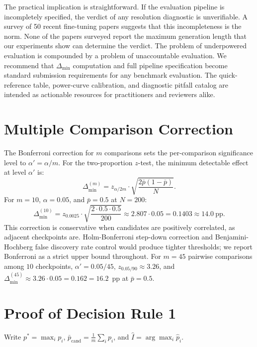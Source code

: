\documentclass[pdflatex,sn-mathphys-ay,iicol]{sn-jnl}
\theoremstyle{thmstylethree}
\begin{document}
\begin{table}[t]
\begin{table}[t]
The practical implication is straightforward. If the evaluation pipeline is incompletely specified, the verdict of any resolution diagnostic is unverifiable. A survey of 50 recent fine-tuning papers suggests that this incompleteness is the norm. None of the papers surveyed report the maximum generation length that our experiments show can determine the verdict. The problem of underpowered evaluation is compounded by a problem of unaccountable evaluation. We recommend that $\Delta_{\min}$ computation and full pipeline specification become standard submission requirements for any benchmark evaluation. The quick-reference table, power-curve calibration, and diagnostic pitfall catalog are intended as actionable resources for practitioners and reviewers alike.

\appendix

\section{Multiple Comparison Correction}\label{app:proof}

The Bonferroni correction for $m$ comparisons sets the per-comparison significance level to $\alpha' = \alpha / m$. For the two-proportion $z$-test, the minimum detectable effect at level $\alpha'$ is:
\[
\Delta_{\min}^{(m)} = z_{\alpha/2m} \cdot \sqrt{\frac{2\bar{p}(1-\bar{p})}{N}}.
\]
For $m=10$, $\alpha=0.05$, and $\bar{p}=0.5$ at $N=200$:
\[
\Delta_{\min}^{(10)} = z_{0.0025} \cdot \sqrt{\frac{2 \cdot 0.5 \cdot 0.5}{200}} \approx 2.807 \cdot 0.05 = 0.1403 \approx 14.0\ \text{pp}.
\]
This correction is conservative when candidates are positively correlated, as adjacent checkpoints are. Holm-Bonferroni step-down correction and Benjamini-Hochberg false discovery rate control would produce tighter thresholds; we report Bonferroni as a strict upper bound throughout. For $m=45$ pairwise comparisons among $10$ checkpoints, $\alpha' = 0.05/45$, $z_{0.05/90} \approx 3.26$, and $\Delta_{\min}^{(45)} \approx 3.26 \cdot 0.05 = 0.162 = 16.2$~pp at $\bar{p}=0.5$.

\section{Proof of Decision Rule 1}\label{app:rule_proof}

Write $p^* = \max_i p_i$, $\bar p_{\mathrm{cand}} = \frac{1}{m}\sum_i p_i$, and $\hat I = \arg\max_i \hat p_i$.


\end{table}
\end{table}
\end{document}

